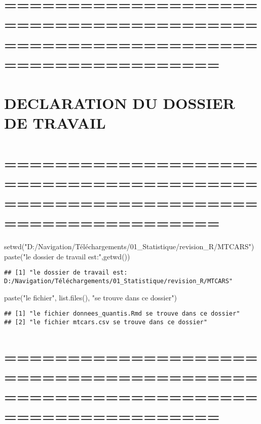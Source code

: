 \documentclass[
]{article}
\newenvironment{Shaded}{\begin{snugshade}}{\end{snugshade}}
\newcommand{\FunctionTok}[1]{\textcolor[rgb]{0.00,0.00,0.00}{#1}}
\newcommand{\NormalTok}[1]{#1}
\newcommand{\StringTok}[1]{\textcolor[rgb]{0.31,0.60,0.02}{#1}}
\begin{document}
\hypertarget{section-2}{%
\section{=============================================================================}\label{section-2}}

\hypertarget{declaration-du-dossier-de-travail}{%
\section{DECLARATION DU DOSSIER DE
TRAVAIL}\label{declaration-du-dossier-de-travail}}

\hypertarget{section-3}{%
\section{=============================================================================}\label{section-3}}

\begin{Shaded}
\begin{Highlighting}[]
\FunctionTok{setwd}\NormalTok{(}\StringTok{"D:/Navigation/Téléchargements/01\_Statistique/revision\_R/MTCARS"}\NormalTok{)}
\FunctionTok{paste}\NormalTok{(}\StringTok{"le dossier de travail est:"}\NormalTok{,}\FunctionTok{getwd}\NormalTok{())}
\end{Highlighting}
\end{Shaded}

\begin{verbatim}
## [1] "le dossier de travail est: D:/Navigation/Téléchargements/01_Statistique/revision_R/MTCARS"
\end{verbatim}

\begin{Shaded}
\begin{Highlighting}[]
\FunctionTok{paste}\NormalTok{(}\StringTok{"le fichier"}\NormalTok{, }\FunctionTok{list.files}\NormalTok{(), }\StringTok{"se trouve dans ce dossier"}\NormalTok{)}
\end{Highlighting}
\end{Shaded}

\begin{verbatim}
## [1] "le fichier donnees_quantis.Rmd se trouve dans ce dossier"
## [2] "le fichier mtcars.csv se trouve dans ce dossier"
\end{verbatim}

\hypertarget{section-4}{%
\section{=============================================================================}\label{section-4}}
\end{document}
